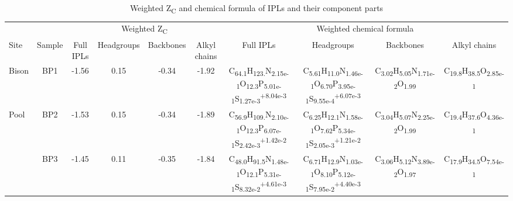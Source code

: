 \begin{landscape}
\singlespace

\begin{table}
\centering
\normalsize
\begin{adjustbox}{width=600pt,keepaspectratio}
\begin{threeparttable}
  \caption{Weighted Z\textsubscript{C} and chemical formula of IPLs and their component parts}


\begin{tabular}{lccccccccc}
\toprule
      &       & \multicolumn{4}{c}{Weighted Z\textsubscript{C}} & \multicolumn{4}{c}{Weighted chemical formula} \\
\cmidrule(l{2pt}r{2pt}){3-6} \cmidrule(l{2pt}r{2pt}){7-10}Site  & Sample & Full IPLs & Headgroups & Backbones & Alkyl chains & Full IPLs & Headgroups & Backbones & Alkyl chains \\
\midrule
Bison & BP1   & -1.56 & 0.15  & -0.34 & -1.92 & C\textsubscript{64.1}H\textsubscript{123.}N\textsubscript{2.15e-1}O\textsubscript{12.3}P\textsubscript{5.01e-1}S\textsubscript{1.27e-3}\textsuperscript{+8.04e-3} & C\textsubscript{5.61}H\textsubscript{11.0}N\textsubscript{1.46e-1}O\textsubscript{6.70}P\textsubscript{3.95e-1}S\textsubscript{9.55e-4}\textsuperscript{+6.07e-3} & C\textsubscript{3.02}H\textsubscript{5.05}N\textsubscript{1.71e-2}O\textsubscript{1.99} & C\textsubscript{19.8}H\textsubscript{38.5}O\textsubscript{2.85e-1} \\
Pool  & BP2   & -1.53 & 0.15  & -0.34 & -1.89 & C\textsubscript{56.9}H\textsubscript{109.}N\textsubscript{2.10e-1}O\textsubscript{12.3}P\textsubscript{6.07e-1}S\textsubscript{2.42e-3}\textsuperscript{+1.42e-2} & C\textsubscript{6.25}H\textsubscript{12.1}N\textsubscript{1.58e-1}O\textsubscript{7.62}P\textsubscript{5.34e-1}S\textsubscript{2.05e-3}\textsuperscript{+1.21e-2} & C\textsubscript{3.04}H\textsubscript{5.07}N\textsubscript{2.25e-2}O\textsubscript{1.99} & C\textsubscript{19.4}H\textsubscript{37.6}O\textsubscript{4.36e-1} \\
      & BP3   & -1.45 & 0.11  & -0.35 & -1.84 & C\textsubscript{48.0}H\textsubscript{91.5}N\textsubscript{1.48e-1}O\textsubscript{12.1}P\textsubscript{5.31e-1}S\textsubscript{8.32e-2}\textsuperscript{+4.61e-3} & C\textsubscript{6.71}H\textsubscript{12.9}N\textsubscript{1.03e-1}O\textsubscript{8.10}P\textsubscript{5.12e-1}S\textsubscript{7.95e-2}\textsuperscript{+4.40e-3} & C\textsubscript{3.06}H\textsubscript{5.12}N\textsubscript{3.89e-2}O\textsubscript{1.97} & C\textsubscript{17.9}H\textsubscript{34.5}O\textsubscript{7.54e-1} \\

\end{tabular}
\end{threeparttable}
\end{adjustbox}
\end{table}
\end{landscape}
